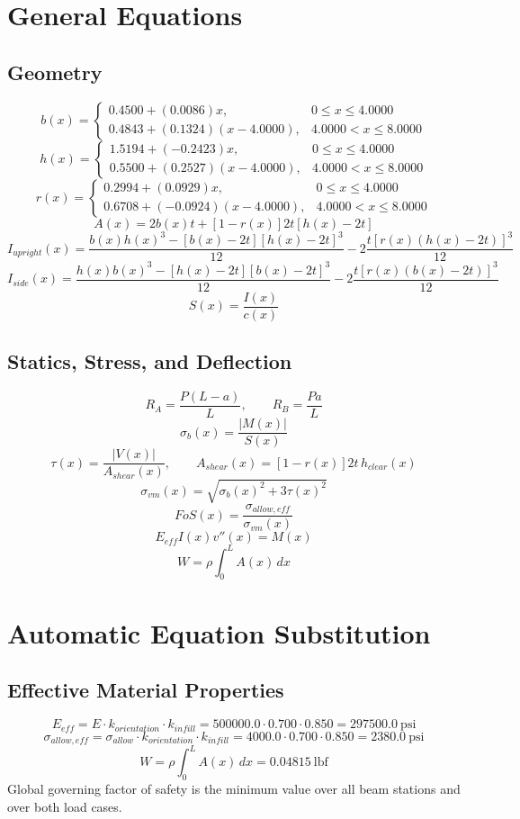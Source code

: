 \documentclass[11pt]{article}
\begin{document}
\section*{General Equations}
\subsection*{Geometry}
\[
b(x)=\begin{cases}0.4500 + (0.0086)x, & 0 \le x \le 4.0000\\0.4843 + (0.1324)(x-4.0000), & 4.0000 < x \le 8.0000\end{cases}
\]
\[
h(x)=\begin{cases}1.5194 + (-0.2423)x, & 0 \le x \le 4.0000\\0.5500 + (0.2527)(x-4.0000), & 4.0000 < x \le 8.0000\end{cases}
\]
\[
r(x)=\begin{cases}0.2994 + (0.0929)x, & 0 \le x \le 4.0000\\0.6708 + (-0.0924)(x-4.0000), & 4.0000 < x \le 8.0000\end{cases}
\]
\[
A(x)=2b(x)t+[1-r(x)]2t[h(x)-2t]
\]
\[
I_{upright}(x)=\frac{b(x)h(x)^3-[b(x)-2t][h(x)-2t]^3}{12}-2\frac{t[r(x)(h(x)-2t)]^3}{12}
\]
\[
I_{side}(x)=\frac{h(x)b(x)^3-[h(x)-2t][b(x)-2t]^3}{12}-2\frac{t[r(x)(b(x)-2t)]^3}{12}
\]
\[
S(x)=\frac{I(x)}{c(x)}
\]

\subsection*{Statics, Stress, and Deflection}
\[
R_A=\frac{P(L-a)}{L}, \qquad R_B=\frac{Pa}{L}
\]
\[
\sigma_b(x)=\frac{|M(x)|}{S(x)}
\]
\[
\tau(x)=\frac{|V(x)|}{A_{shear}(x)}, \qquad A_{shear}(x)=[1-r(x)]2t\,h_{clear}(x)
\]
\[
\sigma_{vm}(x)=\sqrt{\sigma_b(x)^2+3\tau(x)^2}
\]
\[
FoS(x)=\frac{\sigma_{allow,eff}}{\sigma_{vm}(x)}
\]
\[
E_{eff}I(x)v''(x)=M(x)
\]
\[
W=\rho\int_0^L A(x)\,dx
\]

\section*{Automatic Equation Substitution}
\subsection*{Effective Material Properties}
\[E_{eff} = E \cdot k_{orientation} \cdot k_{infill} = 500000.0 \cdot 0.700 \cdot 0.850 = 297500.0\ \mathrm{psi}\]
\[\sigma_{allow,eff} = \sigma_{allow} \cdot k_{orientation} \cdot k_{infill} = 4000.0 \cdot 0.700 \cdot 0.850 = 2380.0\ \mathrm{psi}\]
\[W = \rho \int_0^L A(x)\,dx = 0.04815\ \mathrm{lbf}\]
Global governing factor of safety is the minimum value over all beam stations and over both load cases.
\end{document}
